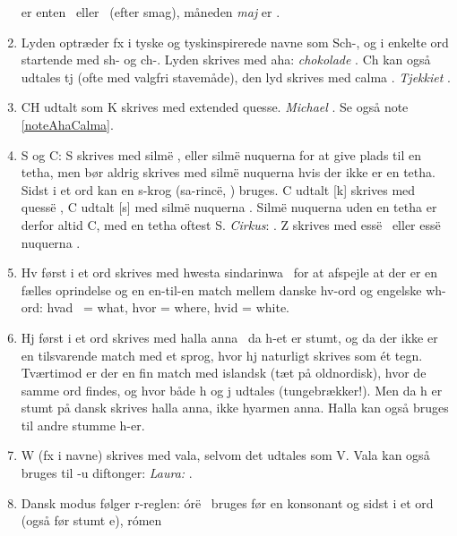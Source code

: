 \documentclass[a4paper]{article}
\begin{document}
\begin{enumerate}
  er enten \Tmalta\Ttelco\TTthreedots\Ttelco\TTdot ~eller
  \Tmalta\Tanna\TTdot ~(efter smag), måneden \emph{maj} er
  \Tmalta\Tanna\TTdot.\label{noteJ}
\item Lyden \textipa{[S]} optræder fx i tyske og tyskinspirerede navne
  som Sch-, og i enkelte ord startende med sh- og ch-.  Lyden skrives
  med aha: \emph{chokolade}
  \Taha\Tquesse\TTrightcurl\Tlambe\TTrightcurl\Tanto\TTthreedots\TTdotbelow.
  Ch kan også udtales tj \textipa{[tS]} (ofte med valgfri stavemåde),
  den lyd skrives med calma \Tcalma.  \emph{Tjekkiet}
  \Tcalma\Tquesse\TTacute\TTdoubler\Ttelco\TTdot\Ttinco\TTacute.
\item CH udtalt som K skrives med extended quesse.  \emph{Michael}
  \Tmalta\Textendedquesse\TTdot\Ttelco\TTthreedots\TTdotbelow\Tlambe.
  Se også note \ref{noteAhaCalma}.
\item S og C: S skrives med silm\"e \Tsilme, eller silm\"e nuquerna
  for at give plads til en tetha, men bør aldrig skrives med silm\"e
  nuquerna hvis der ikke er en tetha.  Sidst i et ord kan en s-krog
  (sa-rinc\"e, \Tempty\Trighthook) bruges.  C udtalt [k] skrives med quess\"e
  \Tquesse, C udtalt [s] med silm\"e nuquerna \Tsilmenuquerna.
  Silm\"e nuquerna uden en tetha er derfor altid C, med en tetha
  oftest S.  \emph{Cirkus}:
  \Tsilmenuquerna\Toore\TTdot\Tquesse\Tsilmenuquerna\TTrightcurl. Z
  skrives med ess\"e \Tesse ~eller ess\"e nuquerna \Tessenuquerna.
\item Hv først i et ord skrives med hwesta sindarinwa
  \Thwestasindarinwa ~for at afspejle at der er en fælles oprindelse
  og en en-til-en match mellem danske hv-ord og engelske wh-ord: hvad
  \Thwestasindarinwa\Tanto\TTthreedots ~= what, hvor = where, hvid =
  white.
\item Hj først i et ord skrives med halla anna \Thalla\Tanna ~da h-et
  er stumt, og da der ikke er en tilsvarende match med et sprog, hvor
  hj naturligt skrives som \'et tegn.  Tværtimod er der en fin match med
  islandsk (tæt på oldnordisk), hvor de samme ord findes, og hvor både
  h og j udtales (tungebrækker!).  Men da h er stumt på dansk skrives halla
  anna, ikke hyarmen anna.  Halla kan også bruges til andre stumme
  h-er.
\item W (fx i navne) skrives med vala, selvom det udtales som V.  Vala
  kan også bruges til -u diftonger: \emph{Laura:}
  \Tlambe\Tvala\TTthreedots\Troomen\Ttelco\TTthreedots.
\item Dansk modus følger r-reglen: \'or\"e \Toore ~bruges før en
  konsonant og sidst i et ord (også før stumt e), r\'omen \Troomen

\end{enumerate}
\end{document}
